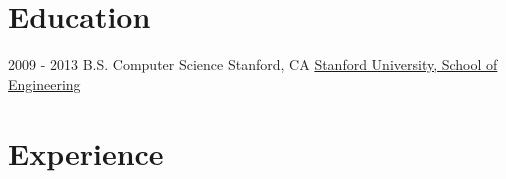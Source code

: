 \documentclass[letterpaper]{twentysecondcv} %
\begin{document}
\makeprofile %

\section{Education}

\begin{twenty} %
	\twentyitem
    	{2009 - 2013}
		{}
        {B.S. Computer Science}
        {Stanford, CA}
        {}
        {\href{http://cs.stanford.edu/}{Stanford University, School of Engineering}}
\end{twenty}


\section{Experience}
\end{document}
